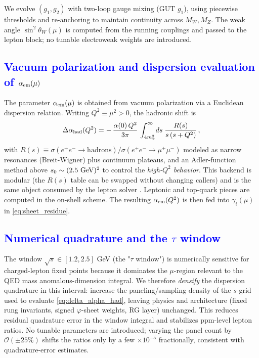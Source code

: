 \documentclass[%
amsmath,amssymb,
aps,
prb,
floatfix,showkeys
]{revtex4-2}
\newcommand{\modif}[1]{\textcolor{blue}{#1}}
\begin{document}
We evolve $(g_1,g_2)$ with two-loop gauge mixing (GUT $g_1$), using piecewise thresholds and re-anchoring to maintain continuity across $M_W,M_Z$. The weak angle $\sin^2\theta_W(\mu)$ is computed from the running couplings and passed to the lepton block; no tunable electroweak weights are introduced.

{\modif{\subsection{Vacuum polarization and dispersion evaluation of $\alpha_{\rm em}(\mu)$}
\label{subsec:dispersion_alphaem}}}

The parameter $\alpha_{\rm em}(\mu)$ is obtained from vacuum polarization via a Euclidean dispersion relation. Writing $Q^2\equiv\mu^2>0$, the hadronic shift is
\begin{equation}
  \Delta\alpha_{\rm had}(Q^2) = -\,\frac{\alpha(0)\,Q^2}{3\pi}\,\int_{4m_\pi^2}^{\infty}\! ds\;\frac{R(s)}{s\,(s+Q^2)}\,,
  \label{eq:delta_alpha_had}
\end{equation}
with $R(s)\equiv \sigma(e^+e^-\!\to\!\text{hadrons})/\sigma(e^+e^-\!\to\!\mu^+\mu^-)$ modeled as narrow resonances (Breit-Wigner) plus continuum plateaus, and an Adler-function method above $s_0\sim(2.5~{\rm GeV})^2$ to control the \emph{high-$Q^2$ behavior}. This backend is modular (the $R(s)$ table can be swapped without changing callers) and is the same object consumed by the lepton solver \cite{EidelmanJegerlehner1995,Jegerlehner2003,Keshavarzi2019,Davier2017}. Leptonic and top-quark pieces are computed in the on-shell scheme. The resulting $\alpha_{\rm em}(Q^2)$ is then fed into $\gamma_i(\mu)$ in \eqref{eq:sheet_residue}.

{\modif{\subsection{Numerical quadrature and the $\tau$ window}
\label{subsec:tau_window}}}

The window $\sqrt{s}\in[1.2,2.5]$ GeV (the "$\tau$ window") is numerically sensitive for charged-lepton fixed points because it dominates the $\mu$-region relevant to the QED mass anomalous-dimension integral. We therefore \emph{densify} the dispersion quadrature in this interval: increase the paneling/sampling density of the $s$-grid used to evaluate \eqref{eq:delta_alpha_had}, leaving physics and architecture (fixed rung invariants, signed $\varphi$-sheet weights, RG layer) unchanged. This reduces residual quadrature error in the window integral and stabilizes ppm-level lepton ratios. No tunable parameters are introduced; varying the panel count by $\mathcal{O}(\pm 25\%)$ shifts the ratios only by a few $\times 10^{-5}$ fractionally, consistent with quadrature-error estimates.
\end{document}
